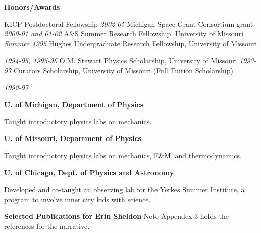 \documentclass[12pt]{article}
\begin{document}
\ssp
\ssp
\noindent
\parbox[l]{1.25in}{{\bf Honors/Awards}}
\parbox[t]{5.40in}{
KICP Postdoctoral Fellowship \hfill {\small \it 2002-05} \newline
Michigan Space Grant Consortium grant  \hfill 
       {\small \it 2000-01 and 01-02 }\newline
A\&S Summer Research Fellowship, University of Missouri \hfill 
       {\small \it Summer 1995}\newline
Hughes Undergraduate Research Fellowship, University of
       Missouri  
	   
	   \hfill {\small \it 1994-95, 1995-96}\newline
O.M. Stewart Physics Scholarship, University
       of Missouri \hfill {\small \it 1993-97}\newline
Curators Scholarship, University of Missouri 
       (Full Tuition Scholarship) 
	   
	   \hfill {\small \it 1992-97}
}

\newpage
\ssp
\ssp
\noindent
{}
{{\bf U. of Michigan, Department of Physics}}
\hfill
{}

\noindent
\makebox[1.25in][l]{}
\parbox[t]{5.40in}{Taught introductory physics labs on mechanics.}

\ssp
\noindent
\makebox[1.25in][l]{}
{{\bf U. of Missouri, Department of Physics}}
\hfill
{}

\noindent
\makebox[1.25in][l]{}
\parbox[t]{5.40in}{Taught introductory physics labs on mechanics, E\&M, and thermodynamics.}

\ssp
\noindent
\makebox[1.25in][l]{}
{{\bf U. of Chicago, Dept. of Physics and Astronomy}}

\hfill
{}

\noindent
\makebox[1.25in][l]{}
\parbox[t]{5.40in}{Developed and co-taught an observing lab for the Yerkes Summer Institute, a program to involve inner city kids with science.} 


\vspace{0.2in}
\noindent
\newline
\newline
{\Large {\bf Selected Publications for Erin Sheldon} }
\newline
Note Appendex 3 holds the references for the narrative. 
\vspace{4mm}
\end{document}
